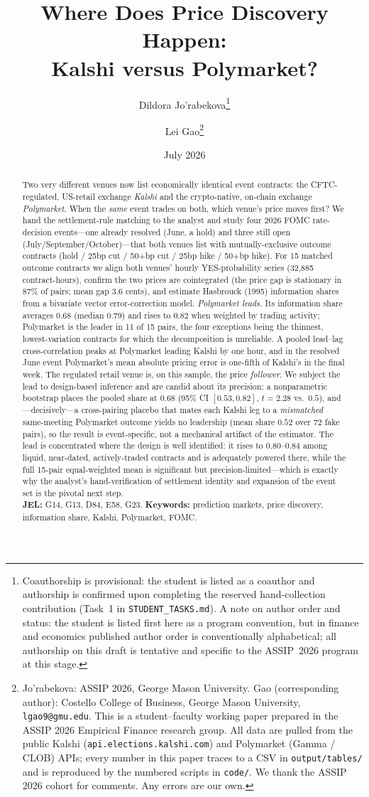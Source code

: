 \documentclass[12pt]{article}
\title{\textbf{Where Does Price Discovery Happen:\\ Kalshi versus Polymarket?}}
\author{Dildora Jo'rabekova\thanks{Coauthorship is provisional: the student is listed as a coauthor and authorship is confirmed upon completing the reserved hand-collection contribution (Task~1 in \texttt{STUDENT\_TASKS.md}). A note on author order and status: the student is listed first here as a program convention, but in finance and economics published author order is conventionally alphabetical; all authorship on this draft is tentative and specific to the ASSIP~2026 program at this stage.} \and Lei Gao\thanks{Jo'rabekova: ASSIP 2026, George Mason
University. Gao (corresponding author): Costello College of Business, George Mason
University, \texttt{lgao9@gmu.edu}. This is a student--faculty working paper prepared in
the ASSIP 2026 Empirical Finance research group. All data are pulled from the public Kalshi
(\texttt{api.elections.kalshi.com}) and Polymarket (Gamma / CLOB) APIs; every number in this
paper traces to a CSV in \texttt{output/tables/} and is reproduced by the numbered scripts in
\texttt{code/}. We thank the ASSIP 2026 cohort for comments. Any errors are our own.}}
\date{July 2026}
\begin{document}
\maketitle

\begin{abstract}
\noindent Two very different venues now list economically identical event contracts: the
CFTC-regulated, US-retail exchange \emph{Kalshi} and the crypto-native, on-chain exchange
\emph{Polymarket}. When the \emph{same} event trades on both, which venue's price moves
first? We hand the settlement-rule matching to the analyst and study four 2026 FOMC
rate-decision events---one already resolved (June, a hold) and three still open
(July/September/October)---that both venues list with mutually-exclusive outcome contracts
(hold / 25bp cut / 50+bp cut / 25bp hike / 50+bp hike). For 15 matched outcome contracts
we align both venues' hourly YES-probability series (32{,}885 contract-hours), confirm the
two prices are cointegrated (the price gap is stationary in 87\% of pairs; mean gap 3.6
cents), and estimate Hasbrouck (1995) information shares from a bivariate vector
error-correction model. \emph{Polymarket leads.} Its information share averages 0.68
(median 0.79) and rises to 0.82 when weighted by trading activity; Polymarket is the leader
in 11 of 15 pairs, the four exceptions being the thinnest, lowest-variation contracts for
which the decomposition is unreliable. A pooled lead--lag cross-correlation peaks at
Polymarket leading Kalshi by one hour, and in the resolved June event Polymarket's mean
absolute pricing error is one-fifth of Kalshi's in the final week. The regulated retail
venue is, on this sample, the price \emph{follower}. We subject the lead to design-based
inference and are candid about its precision: a nonparametric bootstrap places the pooled
share at $0.68$ (95\% CI $[0.53,0.82]$, $t=2.28$ vs.\ $0.5$), and---decisively---a
cross-pairing placebo that mates each Kalshi leg to a \emph{mismatched} same-meeting
Polymarket outcome yields no leadership (mean share $0.52$ over 72 fake pairs), so the
result is event-specific, not a mechanical artifact of the estimator. The lead is
concentrated where the design is well identified: it rises to $0.80$--$0.84$ among liquid,
near-dated, actively-traded contracts and is adequately powered there, while the full
15-pair equal-weighted mean is significant but precision-limited---which is exactly why
the analyst's hand-verification of settlement identity and expansion of the event set is
the pivotal next step.\\[4pt]
\noindent\textbf{JEL:} G14, G13, D84, E58, G23. \quad
\textbf{Keywords:} prediction markets, price discovery, information share, Kalshi,
Polymarket, FOMC.
\end{abstract}
\end{document}
